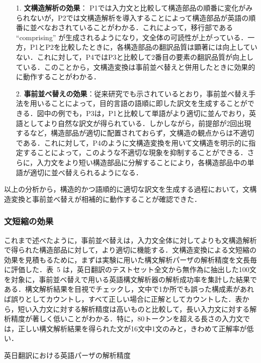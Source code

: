 \documentclass[japanese]{jnlp_1.4}
\begin{document}
\begin{itemize}
\item[1.] \textbf{文構造解析の効果}： P1では入力文と比較して構造部品の順番に変化がみられないが，P2では文構造解析を導入することによって構造部品が英語の順番に並べなおされていることがわかる．これによって，移行部である ``comprising'' が生成されるようになり，文全体の可読性が上がっている．一方，P1とP2を比較したときに，各構造部品の翻訳品質は顕著には向上していない．これに対して，P4ではP3と比較して2番目の要素の翻訳品質が向上している．このことから，文構造変換は事前並べ替えと併用したときに効果的に動作することがわかる．
\item[2.] \textbf{事前並べ替えの効果}：従来研究でも示されているとおり，事前並べ替え手法を用いることによって，目的言語の語順に即した訳文を生成することができる．図中の例でも，P3は，P1と比較して単語がより適切に並んでおり，英語としてより自然な訳文が得られている．しかしながら，前提部が2回出現するなど，構造部品が適切に配置されておらず，文構造の観点からは不適切である．これに対して，P4のように文構造変換を用いて文構造を明示的に指定することによって，このような不適切な現象を抑制することができる．さらに，入力文をより短い構造部品に分解することにより，各構造部品中の単語が適切に並べ替えられるようになる．
\end{itemize}
\vspace{1\Cvs}

以上の分析から，構造的かつ語順的に適切な訳文を生成する過程において，文構造変換と事前並べ替えが相補的に動作することが確認できた．


\subsubsection{文短縮の効果}

これまで述べたように，事前並べ替えは，入力文全体に対してよりも文構造解析で得られた構造部品に対して，より適切に機能する．文構造変換による文短縮の効果を見積もるために，まずは実験に用いた構文解析パーザの解析精度を文長毎に評価した．表~5 は，英日翻訳のテストセット全文から無作為に抽出した100文を対象に，事前並べ替えで用いる英語構文解析器の解析成功率を集計した結果である．構文解析結果を目視でチェックし，文中で1か所でも誤った構成素があれば誤りとしてカウントし，すべて正しい場合に正解としてカウントした．表から，短い入力文に対する解析精度は高いものと比較して，長い入力文に対する解析精度が著しく低いことがわかる．特に，80トークンを超える長さの入力文では，正しい構文解析結果を得られた文が16文中1文のみと，きわめて正解率が低い．

\begin{table}[b]
\caption{英日翻訳における英語パーザの解析精度}
\label{tab05}

\end{table}
\end{document}
